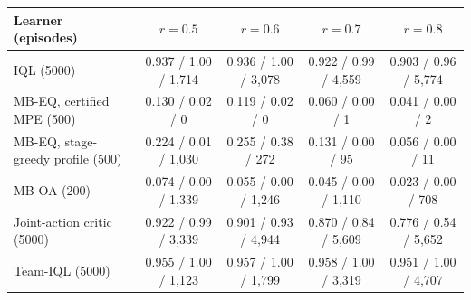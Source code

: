 \begin{tabular}{lcccc}
\toprule
Learner (episodes) & $r=0.5$ & $r=0.6$ & $r=0.7$ & $r=0.8$ \\
\midrule
IQL (5000) & 0.937 / 1.00 / 1{,}714 & 0.936 / 1.00 / 3{,}078 & 0.922 / 0.99 / 4{,}559 & 0.903 / 0.96 / 5{,}774 \\
MB-EQ, certified MPE (500) & 0.130 / 0.02 / 0 & 0.119 / 0.02 / 0 & 0.060 / 0.00 / 1 & 0.041 / 0.00 / 2 \\
MB-EQ, stage-greedy profile (500) & 0.224 / 0.01 / 1{,}030 & 0.255 / 0.38 / 272 & 0.131 / 0.00 / 95 & 0.056 / 0.00 / 11 \\
MB-OA (200) & 0.074 / 0.00 / 1{,}339 & 0.055 / 0.00 / 1{,}246 & 0.045 / 0.00 / 1{,}110 & 0.023 / 0.00 / 708 \\
Joint-action critic (5000) & 0.922 / 0.99 / 3{,}339 & 0.901 / 0.93 / 4{,}944 & 0.870 / 0.84 / 5{,}609 & 0.776 / 0.54 / 5{,}652 \\
Team-IQL (5000) & 0.955 / 1.00 / 1{,}123 & 0.957 / 1.00 / 1{,}799 & 0.958 / 1.00 / 3{,}319 & 0.951 / 1.00 / 4{,}707 \\
\bottomrule
\end{tabular}
